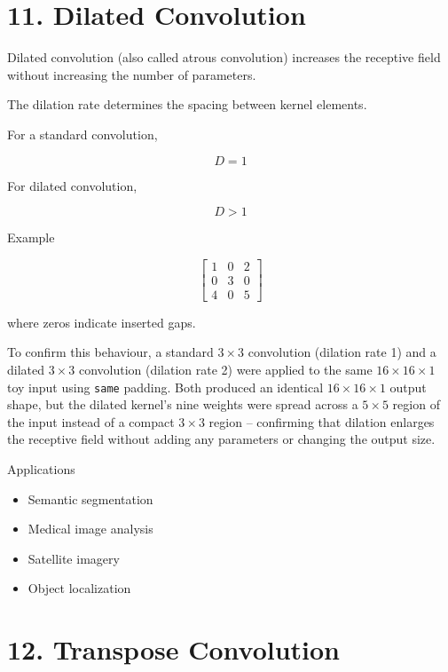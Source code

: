 \documentclass[11pt]{article}
\begin{document}

\section*{11. Dilated Convolution}

Dilated convolution (also called atrous convolution) increases the
receptive field without increasing the number of parameters.

The dilation rate determines the spacing between kernel elements.

For a standard convolution,

\[
D=1
\]

For dilated convolution,

\[
D>1
\]

Example

\[
\begin{bmatrix}
1 & 0 & 2\\
0 & 3 & 0\\
4 & 0 & 5
\end{bmatrix}
\]

where zeros indicate inserted gaps.

To confirm this behaviour, a standard $3\times3$ convolution
(dilation rate 1) and a dilated $3\times3$ convolution (dilation
rate 2) were applied to the same $16\times16\times1$ toy input
using \texttt{same} padding. Both produced an identical
$16\times16\times1$ output shape, but the dilated kernel's nine
weights were spread across a $5\times5$ region of the input instead
of a compact $3\times3$ region -- confirming that dilation enlarges
the receptive field without adding any parameters or changing the
output size.

Applications

\begin{itemize}
\item Semantic segmentation
\item Medical image analysis
\item Satellite imagery
\item Object localization
\end{itemize}


\section*{12. Transpose Convolution}
\end{document}
